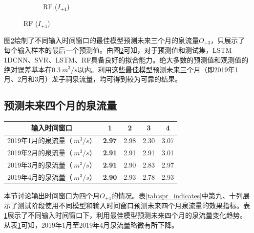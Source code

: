 \begin{figure}[!htbp]
\begin{subfigure}[b]{0.615\textwidth}
    \caption{RF ($I_{+4}$)}
    \label{fig:spr_series_in_4_out_3_rf}
  \end{subfigure}
  \label{fig:spr_out_3}
\end{figure}

图\ref{fig:spr_out_3}绘制了不同输入时间窗口的最佳模型预测未来三个月的泉流量$O_{+3}$，只展示了每个输入样本的最后一个预测值。由图\ref{fig:spr_out_3}可知，对于预测值和测试集，LSTM-1DCNN、SVR、LSTM、RF具备良好的拟合能力。绝大多数的预测值和观测值的绝对误差基本在$\SI{0.3}{m^{3}/s}$以内。利用这些最佳模型预测未来三个月（即2019年1月、2月和3月）龙子祠泉流量，均可得到较为可靠的结果。

\subsection{预测未来四个月的泉流量}\label{sec:spr_four}

\begin{table}[!htbp]
  \centering
  \label{tab:spr_four}
  \footnotesize
  \begin{tabular}{ccccc}
    \toprule
    输入时间窗口 & 1 & 2 & 3 & 4\\
    \midrule
    2019年1月的泉流量（$\SI{}{m^{3}/s}$）& \textbf{2.97} & 2.98 & 2.30 & 3.07 \\
    2019年2月的泉流量（$\SI{}{m^{3}/s}$）& \textbf{2.91} & 2.91 & 2.91 & 3.01 \\
    2019年3月的泉流量（$\SI{}{m^{3}/s}$）& \textbf{2.91} & 2.90 & 2.83 & 2.97 \\
    2019年4月的泉流量（$\SI{}{m^{3}/s}$）& \textbf{2.90} & 2.93 & 2.78 & 2.93 \\
    \bottomrule
  \end{tabular}
\end{table}

本节讨论输出时间窗口为四个月$O_{+4}$的情况。表\ref{tab:spr_indicates}中第九、十列展示了测试阶段使用不同模型和输入时间窗口预测未来四个月泉流量的效果指标。表\ref{tab:spr_four}展示了不同输入时间窗口下，利用最佳模型预测未来四个月的泉流量变化趋势。从表\ref{tab:spr_four}可知，2019年1月至2019年4月泉流量略微有所下降。

